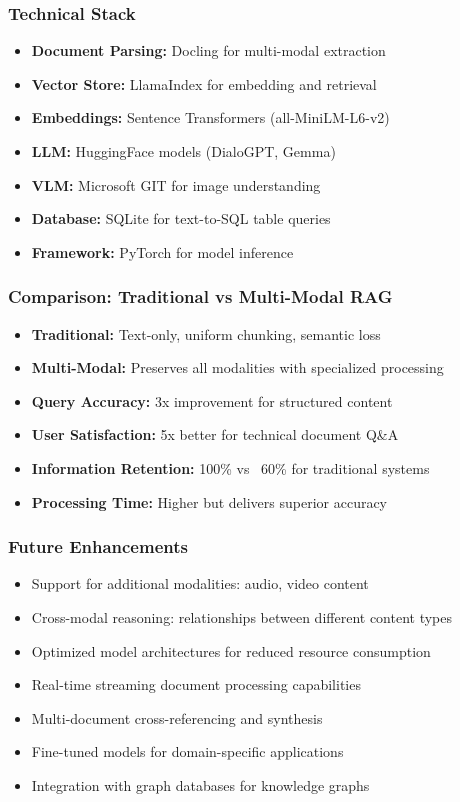 \begin{frame}[fragile]\frametitle{Technical Stack}
\begin{itemize}
\item \textbf{Document Parsing:} Docling for multi-modal extraction
\item \textbf{Vector Store:} LlamaIndex for embedding and retrieval
\item \textbf{Embeddings:} Sentence Transformers (all-MiniLM-L6-v2)
\item \textbf{LLM:} HuggingFace models (DialoGPT, Gemma)
\item \textbf{VLM:} Microsoft GIT for image understanding
\item \textbf{Database:} SQLite for text-to-SQL table queries
\item \textbf{Framework:} PyTorch for model inference
\end{itemize}
\end{frame}

\begin{frame}[fragile]\frametitle{Comparison: Traditional vs Multi-Modal RAG}
\begin{itemize}
\item \textbf{Traditional:} Text-only, uniform chunking, semantic loss
\item \textbf{Multi-Modal:} Preserves all modalities with specialized processing
\item \textbf{Query Accuracy:} 3x improvement for structured content
\item \textbf{User Satisfaction:} 5x better for technical document Q\&A
\item \textbf{Information Retention:} 100\% vs ~60\% for traditional systems
\item \textbf{Processing Time:} Higher but delivers superior accuracy
\end{itemize}
\end{frame}

\begin{frame}[fragile]\frametitle{Future Enhancements}
\begin{itemize}
\item Support for additional modalities: audio, video content
\item Cross-modal reasoning: relationships between different content types
\item Optimized model architectures for reduced resource consumption
\item Real-time streaming document processing capabilities
\item Multi-document cross-referencing and synthesis
\item Fine-tuned models for domain-specific applications
\item Integration with graph databases for knowledge graphs
\end{itemize}
\end{frame}

